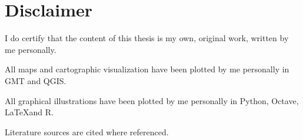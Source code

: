 \documentclass[11pt,a4paper]{report}
\begin{document}





\chapter*{Disclaimer}

\vspace{3em}

		I do certify that the content of this thesis is my own, original work, written by me personally.
		
		All maps and cartographic visualization have been plotted by me personally in GMT and QGIS.
		
		All graphical illustrations have been plotted by me personally in Python, Octave, \LaTeX\space and R.
		
		Literature sources are cited where referenced.
		


\end{document}

